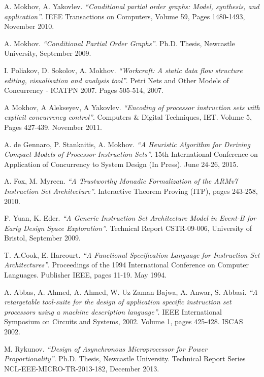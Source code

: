 \documentclass[conference]{IEEEtran}
\begin{document}
\begin{thebibliography}{10}

	A. Mokhov, A. Yakovlev. \emph{``Conditional partial order graphs: Model,
	synthesis, and application''}. IEEE Transactions on Computers, Volume 59,
	Pages 1480-1493, November 2010.
	
	A. Mokhov. \emph{``Conditional Partial Order Graphs''}. Ph.D. Thesis,
	Newcastle University, September 2009.	

	I. Poliakov, D. Sokolov, A. Mokhov. \emph{``Workcraft: A static data flow
	structure editing, visualisation and analysis tool''}. Petri Nets and Other
	Models of Concurrency - ICATPN 2007. Pages 505-514, 2007.
	
	A Mokhov, A Alekseyev, A Yakovlev. \emph{``Encoding of processor instruction
	sets with explicit concurrency control''}. Computers \& Digital Techniques,
	IET. Volume 5, Pages 427-439. November 2011.
	
	A. de Gennaro, P. Stankaitis, A. Mokhov. \emph{``A Heuristic Algorithm for
	Deriving Compact Models of Processor Instruction Sets''}. 15th International
	Conference on Application of Concurrency to System Design (In Press). June
	24-26, 2015.

	A. Fox, M. Myreen. \emph{``A Trustworthy Monadic Formalization of the ARMv7
	Instruction Set Architecture''}. Interactive Theorem Proving (ITP), pages
	243-258, 2010.	
	
	F. Yuan, K. Eder. \emph{``A Generic Instruction Set Architecture Model in
	Event-B for Early Design Space Exploration''}. Technical Report CSTR-09-006,
	University of Bristol, September 2009.

	T. A.Cook, E. Harcourt. \emph{``A Functional Specification Language for
	Instruction Set Architectures''}. Proceedings of the 1994 International
	Conference on Computer Languages. Publisher IEEE, pages 11-19. May 1994.
	
	A. Abbas, A. Ahmed, A. Ahmed, W. Uz Zaman Bajwa, A. Anwar, S. Abbasi. 
	\emph{``A retargetable tool-suite for the design of application specific
	instruction set processors using a machine description language''}. IEEE
	International Symposium on Circuits and Systems, 2002. Volume 1, pages 425-428.
	ISCAS 2002.
	
	M. Rykunov. \emph{``Design of Asynchronous Microprocessor for Power
	Proportionality''}. Ph.D. Thesis, Newcastle University. Technical Report Series
	NCL-EEE-MICRO-TR-2013-182, December 2013.
	

\end{thebibliography}
\end{document}
